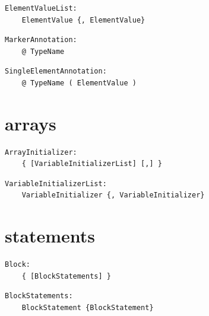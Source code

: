 \noindent\textbf{\texttt{}}\par
\begin{lstlisting}
ElementValueList:
    ElementValue {, ElementValue}
\end{lstlisting}

\noindent\textbf{\texttt{}}\par
\begin{lstlisting}
MarkerAnnotation:
    @ TypeName
\end{lstlisting}

\noindent\textbf{\texttt{}}\par
\begin{lstlisting}
SingleElementAnnotation:
    @ TypeName ( ElementValue )
\end{lstlisting}

\section{arrays}

\noindent\textbf{\texttt{}}\par
\begin{lstlisting}
ArrayInitializer:
    { [VariableInitializerList] [,] }
\end{lstlisting}

\noindent\textbf{\texttt{}}\par
\begin{lstlisting}
VariableInitializerList:
    VariableInitializer {, VariableInitializer}
\end{lstlisting}

\section{statements}

\noindent\textbf{\texttt{}}\par
\begin{lstlisting}
Block:
    { [BlockStatements] }
\end{lstlisting}

\noindent\textbf{\texttt{}}\par
\begin{lstlisting}
BlockStatements:
    BlockStatement {BlockStatement}
\end{lstlisting}

